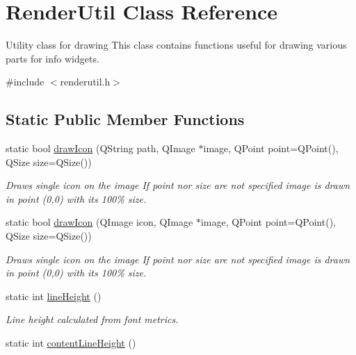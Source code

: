 \hypertarget{classRenderUtil}{
\section{\-Render\-Util \-Class \-Reference}
\label{classRenderUtil}
}


\-Utility class for drawing \-This class contains functions useful for drawing various parts for info widgets.  




{\ttfamily \#include $<$renderutil.\-h$>$}

\subsection*{\-Static \-Public \-Member \-Functions}
\begin{DoxyCompactItemize}
\item 
static bool \hyperlink{classRenderUtil_ac4e208597da2e9b3e0503af145d790d4}{draw\-Icon} (\-Q\-String path, \-Q\-Image $\ast$image, \-Q\-Point point=\-Q\-Point(), \-Q\-Size size=\-Q\-Size())
\begin{DoxyCompactList}\small\item\em \-Draws single icon on the image \-If point nor size are not specified image is drawn in point (0,0) with its 100\% size. \end{DoxyCompactList}\item 
static bool \hyperlink{classRenderUtil_a11d403be3b77b73f28d7cab242a34390}{draw\-Icon} (\-Q\-Image icon, \-Q\-Image $\ast$image, \-Q\-Point point=\-Q\-Point(), \-Q\-Size size=\-Q\-Size())
\begin{DoxyCompactList}\small\item\em \-Draws single icon on the image \-If point nor size are not specified image is drawn in point (0,0) with its 100\% size. \end{DoxyCompactList}\item 
\hypertarget{classRenderUtil_a4bc2beebe6bf0009f1d22f53ef0c88dc}{
static int \hyperlink{classRenderUtil_a4bc2beebe6bf0009f1d22f53ef0c88dc}{line\-Height} ()}
\label{classRenderUtil_a4bc2beebe6bf0009f1d22f53ef0c88dc}

\begin{DoxyCompactList}\small\item\em \-Line height calculated from font metrics. \end{DoxyCompactList}\item 
\hypertarget{classRenderUtil_ae0406fb5d1905243218147ec3dc05cc6}{
static int \hyperlink{classRenderUtil_ae0406fb5d1905243218147ec3dc05cc6}{content\-Line\-Height} ()}
\label{classRenderUtil_ae0406fb5d1905243218147ec3dc05cc6}


\end{DoxyCompactItemize}
